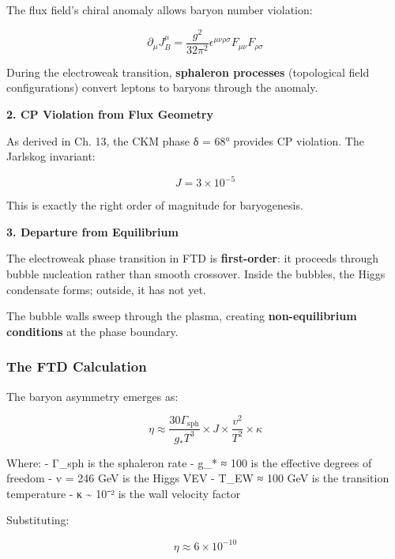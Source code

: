 \documentclass[
  11pt,
  letterpaper,
  twoside,
  openright]{book}
\begin{document}
The flux field's chiral anomaly allows baryon number violation:

\[\partial_\mu J_B^\mu = \frac{g^2}{32\pi^2} \epsilon^{\mu\nu\rho\sigma} F_{\mu\nu}F_{\rho\sigma}\]

During the electroweak transition, \textbf{sphaleron processes}
(topological field configurations) convert leptons to baryons through
the anomaly.

\textbf{2. CP Violation from Flux Geometry}

As derived in Ch. 13, the CKM phase δ = 68° provides CP violation. The
Jarlskog invariant:

\[J = 3 \times 10^{-5}\]

This is exactly the right order of magnitude for baryogenesis.

\textbf{3. Departure from Equilibrium}

The electroweak phase transition in FTD is \textbf{first-order}: it
proceeds through bubble nucleation rather than smooth crossover. Inside
the bubbles, the Higgs condensate forms; outside, it has not yet.

The bubble walls sweep through the plasma, creating
\textbf{non-equilibrium conditions} at the phase boundary.

\subsubsection{The FTD Calculation}\label{the-ftd-calculation}

The baryon asymmetry emerges as:

\[\eta \approx \frac{30 \Gamma_{\text{sph}}}{g_* T^3} \times J \times \frac{v^2}{T^2} \times \kappa\]

Where: - Γ\_sph is the sphaleron rate - g\_* ≈ 100 is the effective
degrees of freedom - v = 246 GeV is the Higgs VEV - T\_EW ≈ 100 GeV is
the transition temperature - κ \textasciitilde{} 10⁻² is the wall
velocity factor

Substituting:

\[\eta \approx 6 \times 10^{-10}\]
\end{document}
